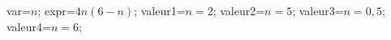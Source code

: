 \documentclass[exercice]{thedocument}%
\begin{document}
%
\>var=$n$;%
\>expr=$4n(6-n)$;%
\>valeur1=$n=2$;%
\>valeur2=$n=5$;%
\>valeur3=$n=0,5$;%
\>valeur4=$n=6$;%
%
\end{document}
